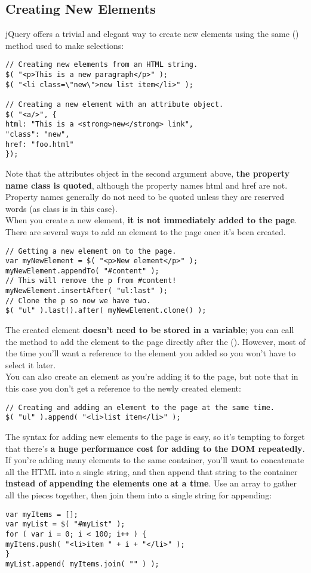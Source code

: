 \documentclass[10pt,letterpaper]{book}
\begin{document}
\subsection{Creating New Elements}
jQuery offers a trivial and elegant way to create new elements using the same \textdollar() method used to make selections:
\begin{lstlisting}
// Creating new elements from an HTML string.
$( "<p>This is a new paragraph</p>" );
$( "<li class=\"new\">new list item</li>" );

// Creating a new element with an attribute object.
$( "<a/>", {
html: "This is a <strong>new</strong> link",
"class": "new",
href: "foo.html"
});
\end{lstlisting}
Note that the attributes object in the second argument above, \textbf{the property name class is quoted}, although the property names html and href are not. Property names generally do not need to be quoted unless they are reserved words (as class is in this case).\\
When you create a new element, \textbf{it is not immediately added to the page}. There are several ways to add an element to the page once it's been created.
\begin{lstlisting}
// Getting a new element on to the page.
var myNewElement = $( "<p>New element</p>" );
myNewElement.appendTo( "#content" );
// This will remove the p from #content!
myNewElement.insertAfter( "ul:last" );
// Clone the p so now we have two.
$( "ul" ).last().after( myNewElement.clone() );
\end{lstlisting}
The created element \textbf{doesn't need to be stored in a variable}; you can call the method to add the element to the page directly after the \textdollar(). However, most of the time you'll want a reference to the element you added so you won't have to select it later.\\
You can also create an element as you're adding it to the page, but note that in this case you don't get a reference to the newly created element:
\begin{lstlisting}
// Creating and adding an element to the page at the same time.
$( "ul" ).append( "<li>list item</li>" );
\end{lstlisting}
The syntax for adding new elements to the page is easy, so it's tempting to forget that there's \textbf{a huge performance cost for adding to the DOM repeatedly}. If you're adding many elements to the same container, you'll want to concatenate all the HTML into a single string, and then append that string to the container \textbf{instead of appending the elements one at a time}. Use an array to gather all the pieces together, then join them into a single string for appending:
\begin{lstlisting}
var myItems = [];
var myList = $( "#myList" );
for ( var i = 0; i < 100; i++ ) {
myItems.push( "<li>item " + i + "</li>" );
}
myList.append( myItems.join( "" ) );
\end{lstlisting}
\end{document}
